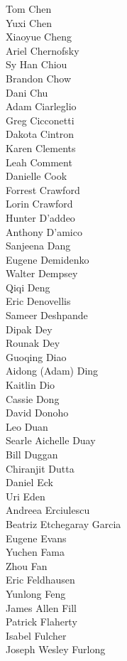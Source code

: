 Tom Chen\\
Yuxi Chen\\
Xiaoyue Cheng\\
Ariel Chernofsky\\
Sy Han Chiou\\
Brandon Chow\\
Dani Chu\\
Adam Ciarleglio\\
Greg Cicconetti\\
Dakota Cintron\\
Karen Clements\\
Leah Comment\\
Danielle Cook\\
Forrest Crawford\\
Lorin Crawford\\
Hunter D'addeo\\
Anthony D'amico\\
Sanjeena Dang\\
Eugene Demidenko\\
Walter Dempsey\\
Qiqi Deng\\
Eric Denovellis\\
Sameer Deshpande\\
Dipak Dey\\
Rounak Dey\\
Guoqing Diao\\
Aidong (Adam) Ding\\
Kaitlin Dio\\
Cassie Dong\\
David Donoho\\
Leo Duan\\
Searle Aichelle Duay\\
Bill Duggan\\
Chiranjit Dutta\\
Daniel Eck\\
Uri Eden\\
Andreea Erciulescu\\
Beatriz Etchegaray Garcia\\
Eugene Evans\\
Yuchen Fama\\
Zhou Fan\\
Eric Feldhausen\\
Yunlong Feng\\
James Allen Fill\\
Patrick Flaherty\\
Isabel Fulcher\\
Joseph Wesley Furlong\\
